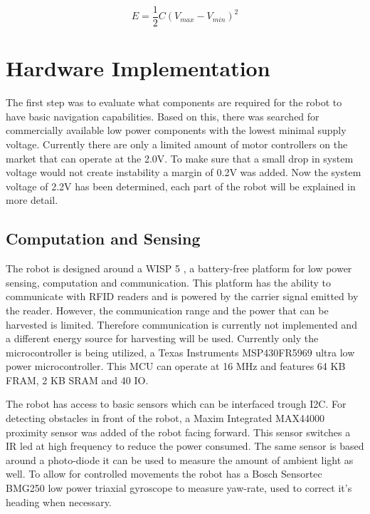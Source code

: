 \begin{equation}
\label{eq:cap2}
E = \frac{1}{2}C(V_{max} - V_{min})^{2}
\end{equation}


	
\section{Hardware Implementation}


The first step was to evaluate what components are required for the robot to have basic navigation capabilities.
Based on this, there was searched for commercially available low power components with the lowest minimal supply voltage.
Currently there are only a limited amount of motor controllers on the market that can operate at the 2.0V.
To make sure that a small drop in system voltage would not create instability a margin of 0.2V was added.
Now the system voltage of 2.2V has been determined, each part of the robot will be explained in more detail. 

\subsection{Computation and Sensing}

The robot is designed around a WISP 5 \cite{wisp5_wiki_2017}, a battery-free platform for low power sensing, computation and communication.
This platform has the ability to communicate with RFID readers and is powered by the carrier signal emitted by the reader.
However, the communication range and the power that can be harvested is limited.
Therefore communication is currently not implemented and a different energy source for harvesting will be used.
Currently only the microcontroller is being utilized, a Texas Instruments MSP430FR5969 ultra low power microcontroller.
This MCU can operate at 16 MHz and features 64 KB FRAM, 2 KB SRAM and 40 IO.

The robot has access to basic sensors which can be interfaced trough I2C.
For detecting obstacles in front of the robot, a Maxim Integrated MAX44000 proximity sensor was added of the robot facing forward.
This sensor switches a IR led at high frequency to reduce the power consumed.
The same sensor is based around a photo-diode it can be used to measure the amount of ambient light as well.
To allow for controlled movements the robot has a Bosch Sensortec BMG250 low power triaxial gyroscope to measure yaw-rate, used to correct it's heading when necessary.

